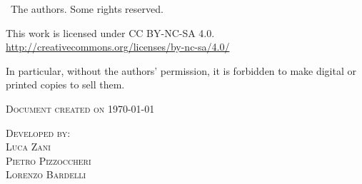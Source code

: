 
\textcopyright \ The authors. Some rights reserved.

This work is licensed under CC BY-NC-SA 4.0.\\
\url{http://creativecommons.org/licenses/by-nc-sa/4.0/}

In particular, without the authors' permission, it is forbidden to make digital or printed copies to sell them.


\textsc{Document created on \today}


\textsc{Developed by:}\\
\textsc{Luca Zani}\\
\textsc{Pietro Pizzoccheri}\\
\textsc{Lorenzo Bardelli}


